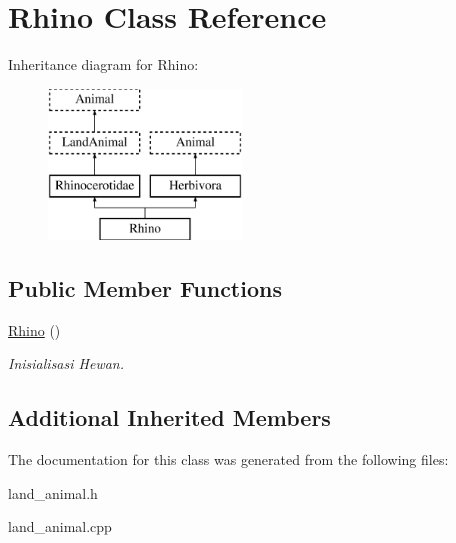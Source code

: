 \hypertarget{class_rhino}{}\section{Rhino Class Reference}
\label{class_rhino}
Inheritance diagram for Rhino\+:\begin{figure}[H]
\begin{center}
\leavevmode
\includegraphics[height=4.000000cm]{class_rhino}
\end{center}
\end{figure}
\subsection*{Public Member Functions}
\begin{DoxyCompactItemize}
\item 
\hyperlink{class_rhino_aa2db135ac8e800310f0531cdbe18bafe}{Rhino} ()\hypertarget{class_rhino_aa2db135ac8e800310f0531cdbe18bafe}{}\label{class_rhino_aa2db135ac8e800310f0531cdbe18bafe}

\begin{DoxyCompactList}\small\item\em Inisialisasi Hewan. \end{DoxyCompactList}\end{DoxyCompactItemize}
\subsection*{Additional Inherited Members}


The documentation for this class was generated from the following files\+:\begin{DoxyCompactItemize}
\item 
land\+\_\+animal.\+h\item 
land\+\_\+animal.\+cpp\end{DoxyCompactItemize}
